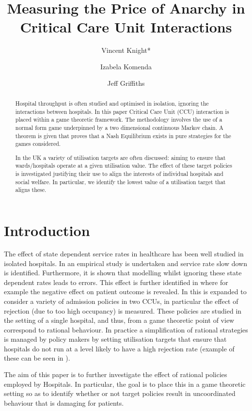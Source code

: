 \documentclass{article}
\title{Measuring the Price of Anarchy in Critical Care Unit Interactions}
\author{Vincent Knight*
    \and
        Izabela Komenda
    \and
        Jeff Griffiths}
\begin{document}
\maketitle

\begin{abstract}
Hospital throughput is often studied and optimised in isolation, ignoring the interactions between hospitals.
In this paper Critical Care Unit (CCU) interaction is placed within a game theoretic framework.
The methodology involves the use of a normal form game underpinned by a two dimensional continuous Markov chain.
A theorem is given that proves that a Nash Equilibrium exists in pure strategies for the games considered.

In the UK a variety of utilisation targets are often discussed: aiming to ensure that wards/hospitals operate at a given utilisation value.
The effect of these target policies is investigated justifying their use to align the interests of individual hospitals and social welfare.
In particular, we identify the lowest value of a utilisation target that aligns these.
\end{abstract}

\section{Introduction}

The effect of state dependent service rates in healthcare has been well studied in isolated hospitals.
In \cite{batt2012doctors} an empirical study is undertaken and service rate slow down is identified.
Furthermore, it is shown that modelling whilst ignoring these state dependent rates leads to errors.
This effect is further identified in \cite{chan2014use, kc2012econometric} where for example the negative effect on patient outcome is revealed.
In \cite{kim2013icu, shmueli2003optimizing} this is expanded to consider a variety of admission policies in two CCUs, in particular the effect of rejection (due to too high occupancy) is measured.
These policies are studied in the setting of a single hospital, and thus, from a game theoretic \cite{Maschler2013} point of view correspond to rational behaviour.
In practice a simplification of rational strategies is managed by policy makers by setting utilisation targets that ensure that hospitals do not run at a level likely to have a high rejection rate (example of these can be seen in \cite{Bevan2006, NHS2013}).

The aim of this paper is to further investigate the effect of rational policies employed by Hospitals.
In particular, the goal is to place this in a game theoretic setting so as to identify whether or not target policies result in uncoordinated behaviour that is damaging for patients.
\end{document}
